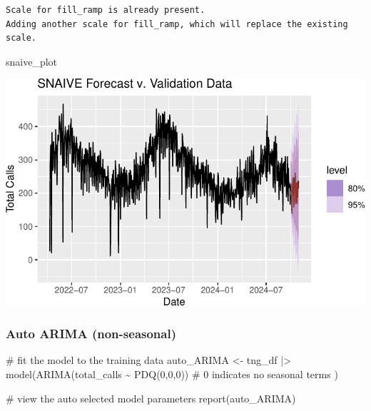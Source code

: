 \documentclass[
  letterpaper,
  DIV=11,
  numbers=noendperiod]{scrartcl}
\newenvironment{Shaded}{\begin{snugshade}}{\end{snugshade}}
\newcommand{\CommentTok}[1]{\textcolor[rgb]{0.37,0.37,0.37}{#1}}
\newcommand{\DecValTok}[1]{\textcolor[rgb]{0.68,0.00,0.00}{#1}}
\newcommand{\FunctionTok}[1]{\textcolor[rgb]{0.28,0.35,0.67}{#1}}
\newcommand{\NormalTok}[1]{\textcolor[rgb]{0.00,0.23,0.31}{#1}}
\newcommand{\OtherTok}[1]{\textcolor[rgb]{0.00,0.23,0.31}{#1}}
\newcommand{\SpecialCharTok}[1]{\textcolor[rgb]{0.37,0.37,0.37}{#1}}
\begin{document}
\begin{verbatim}
Scale for fill_ramp is already present.
Adding another scale for fill_ramp, which will replace the existing scale.
\end{verbatim}

\begin{Shaded}
\begin{Highlighting}[]
\NormalTok{snaive\_plot}
\end{Highlighting}
\end{Shaded}

\includegraphics{final_proj_group1_files/figure-pdf/unnamed-chunk-8-1.pdf}

\subsubsection{Auto ARIMA (non-seasonal)}\label{auto-arima-non-seasonal}

\begin{Shaded}
\begin{Highlighting}[]
\CommentTok{\# fit the model to the training data}
\NormalTok{auto\_ARIMA }\OtherTok{\textless{}{-}}\NormalTok{ tng\_df }\SpecialCharTok{|\textgreater{}}
  \FunctionTok{model}\NormalTok{(}\FunctionTok{ARIMA}\NormalTok{(total\_calls }\SpecialCharTok{\textasciitilde{}} \FunctionTok{PDQ}\NormalTok{(}\DecValTok{0}\NormalTok{,}\DecValTok{0}\NormalTok{,}\DecValTok{0}\NormalTok{)) }\CommentTok{\# 0 indicates no seasonal terms}
\NormalTok{        )}

\CommentTok{\# view the auto selected model parameters}
\FunctionTok{report}\NormalTok{(auto\_ARIMA)}
\end{Highlighting}
\end{Shaded}
\end{document}
